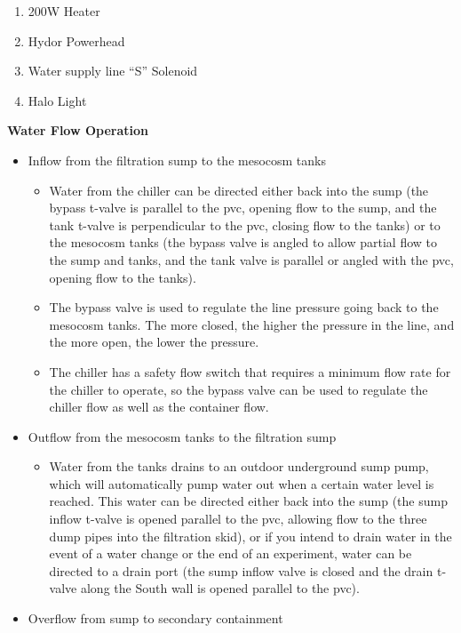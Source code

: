 \documentclass[]{book}
\providecommand{\tightlist}{%
  \setlength{\itemsep}{0pt}\setlength{\parskip}{0pt}}
\begin{document}
\begin{enumerate}
\def\labelenumi{\arabic{enumi}.}
\tightlist
\item
  200W Heater
\item
  Hydor Powerhead
\item
  Water supply line ``S'' Solenoid
\item
  Halo Light
\end{enumerate}

 \textbf{Water Flow Operation}

\begin{itemize}
\tightlist
\item
  Inflow from the filtration sump to the mesocosm tanks

  \begin{itemize}
  \tightlist
  \item
    Water from the chiller can be directed either back into the sump
    (the bypass t-valve is parallel to the pvc, opening flow to the
    sump, and the tank t-valve is perpendicular to the pvc, closing flow
    to the tanks) or to the mesocosm tanks (the bypass valve is angled
    to allow partial flow to the sump and tanks, and the tank valve is
    parallel or angled with the pvc, opening flow to the tanks).
  \item
    The bypass valve is used to regulate the line pressure going back to
    the mesocosm tanks. The more closed, the higher the pressure in the
    line, and the more open, the lower the pressure.
  \item
    The chiller has a safety flow switch that requires a minimum flow
    rate for the chiller to operate, so the bypass valve can be used to
    regulate the chiller flow as well as the container flow.
  \end{itemize}
\item
  Outflow from the mesocosm tanks to the filtration sump

  \begin{itemize}
  \tightlist
  \item
    Water from the tanks drains to an outdoor underground sump pump,
    which will automatically pump water out when a certain water level
    is reached. This water can be directed either back into the sump
    (the sump inflow t-valve is opened parallel to the pvc, allowing
    flow to the three dump pipes into the filtration skid), or if you
    intend to drain water in the event of a water change or the end of
    an experiment, water can be directed to a drain port (the sump
    inflow valve is closed and the drain t-valve along the South wall is
    opened parallel to the pvc).
  \end{itemize}
\item
  Overflow from sump to secondary containment


\end{itemize}
\end{document}
